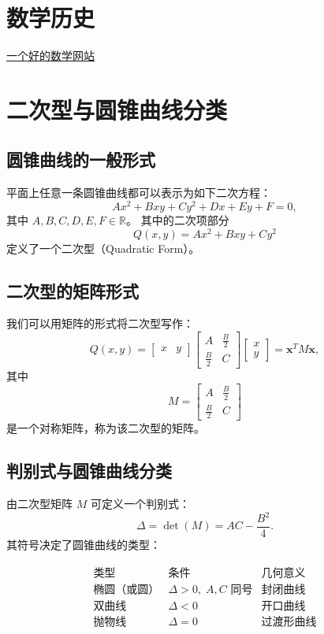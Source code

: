 \documentclass{ctexart}
\begin{document}
\section{数学历史}

\href{https://mathshistory.st-andrews.ac.uk/}{一个好的数学网站}

\section{二次型与圆锥曲线分类}

\subsection{圆锥曲线的一般形式}

平面上任意一条圆锥曲线都可以表示为如下二次方程：
\[
Ax^2 + Bxy + Cy^2 + Dx + Ey + F = 0,
\]
其中 \(A,B,C,D,E,F \in \mathbb{R}\)。  
其中的二次项部分
\[
Q(x, y) = Ax^2 + Bxy + Cy^2
\]
定义了一个二次型（Quadratic Form）。


\subsection{二次型的矩阵形式}

我们可以用矩阵的形式将二次型写作：
\[
Q(x, y) =
\begin{bmatrix}
	x & y
\end{bmatrix}
\begin{bmatrix}
	A & \tfrac{B}{2} \\
	\tfrac{B}{2} & C
\end{bmatrix}
\begin{bmatrix}
	x \\ y
\end{bmatrix}
= \mathbf{x}^T M \mathbf{x},
\]
其中
\[
M =
\begin{bmatrix}
	A & \tfrac{B}{2} \\
	\tfrac{B}{2} & C
\end{bmatrix}
\]
是一个对称矩阵，称为该二次型的矩阵。


\subsection{判别式与圆锥曲线分类}

由二次型矩阵 \(M\) 可定义一个判别式：
\[
\Delta = \det(M) = AC - \frac{B^2}{4}.
\]
其符号决定了圆锥曲线的类型：

\[
\begin{array}{c|c|c}
	\text{类型} & \text{条件} & \text{几何意义} \\ \hline
	\text{椭圆（或圆）} & \Delta > 0,\; A,C\text{ 同号} & \text{封闭曲线} \\
	\text{双曲线} & \Delta < 0 & \text{开口曲线} \\
	\text{抛物线} & \Delta = 0 & \text{过渡形曲线}
\end{array}
\]
\end{document}
